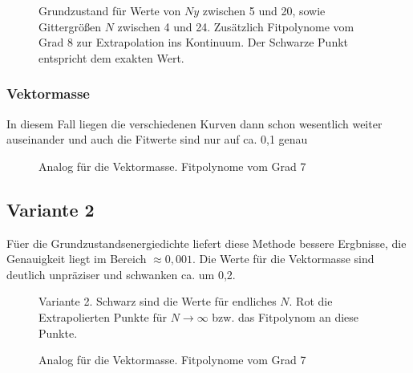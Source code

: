 \documentclass{article}
\begin{document}
\begin{figure}[]
\centering
\hspace*{-0cm}
\caption{Grundzustand für Werte von $Ny$ zwischen 5 und 20, sowie Gittergrößen $N$ zwischen 4 und 24. Zusätzlich Fitpolynome vom Grad 8 zur Extrapolation ins Kontinuum. Der Schwarze Punkt entspricht dem exakten Wert.}
\end{figure}

\subsubsection{Vektormasse}
In diesem Fall liegen die verschiedenen Kurven dann schon wesentlich weiter auseinander und auch die Fitwerte sind nur auf ca. 0,1 genau

\begin{figure}[]
	\centering
	\hspace*{-0cm}
	\caption{Analog für die Vektormasse. Fitpolynome vom Grad 7}
\end{figure}

\subsection{Variante 2}
F\"uer die Grundzustandsenergiedichte liefert diese Methode bessere Ergbnisse, die Genauigkeit liegt im Bereich $\approx 0,001$. Die Werte f\"ur die Vektormasse sind deutlich unpr\"aziser und schwanken ca. um 0,2.

\begin{figure}[]
	\centering
	\hspace*{-0cm}
	\caption{Variante 2. Schwarz sind die Werte f\"ur endliches $N$. Rot die Extrapolierten Punkte f\"ur $N\to \infty$ bzw. das Fitpolynom an diese Punkte.}
\end{figure}
\begin{figure}[]
	\centering
	\hspace*{-0cm}
	\caption{Analog für die Vektormasse. Fitpolynome vom Grad 7}
\end{figure}
\end{document}
